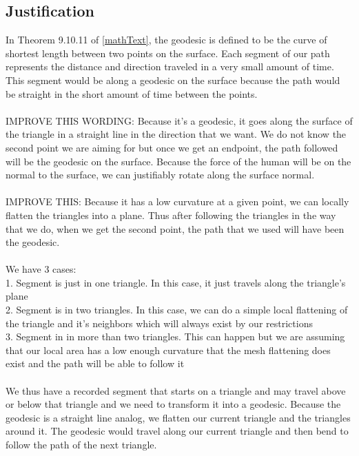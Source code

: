 \documentclass[conference]{acmsiggraph}
\begin{document}
\subsection{Justification}

In Theorem 9.10.11 of \ref{mathText}, the geodesic is defined to be the curve of shortest length between two points on the surface. Each segment of our path represents the distance and direction traveled in a very small amount of time. This segment would be along a geodesic on the surface because the path would be straight in the short amount of time between the points. \\
\\
IMPROVE THIS WORDING:
Because it's a geodesic, it goes along the surface of the triangle in a straight line in the direction that we want. We do not know the second point we are aiming for but once we get an endpoint, the path followed will be the geodesic on the surface. Because the force of the human will be on the normal to the surface, we can justifiably rotate along the surface normal. \\
\\
IMPROVE THIS:
Because it has a low curvature at a given point, we can locally flatten the triangles into a plane. Thus after following the triangles in the way that we do, when we get the second point, the path that we used will have been the geodesic. \\
\\
We have 3 cases:\\
1. Segment is just in one triangle. In this case, it just travels along the triangle's plane\\
2. Segment is in two triangles. In this case, we can do a simple local flattening of the triangle and it's neighbors which will always exist by our restrictions\\
3. Segment in in more than two triangles. This can happen but we are assuming that our local area has a low enough curvature that the mesh flattening does exist and the path will be able to follow it\\
\\
We thus have a recorded segment that starts on a triangle and may travel above or below that triangle and we need to transform it into a geodesic. Because the geodesic is a straight line analog, we flatten our current triangle and the triangles around it. The geodesic would travel along our current triangle and then bend to follow the path of the next triangle.\\
\\





\end{document}

